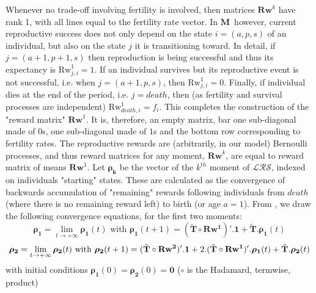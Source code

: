 \documentclass[10pt,a4paper]{article}
\newcommand{\M}{$\mathbf{M}$}
\newcommand{\LRO}{$\mathcal{LRS}$}
\newcommand{\PCoR}{\emph{individual} costs}
\newcommand{\vLRO}{$\sigma_{\mathrm{\mathcal{LRS}}}^2$}
\begin{document}
Whenever no trade-off involving fertility is involved, then matrices $\mathbf{Rw}^{k}$ have rank 1, with all lines equal to the fertility rate vector.%
In \M\ however,%
current reproductive success does not only depend on the state $i=(a,p,s)$ of an individual, but also on the state $j$ it is transitioning toward. In detail, if $j=(a+1,p+1,s)$ then reproduction is being successful and thus its expectancy is $\mathrm{Rw}^{1}_{j,i}=1$. If an individual survives but its reproductive event is not successful, i.e. when $j=(a+1,p,s)$, then $\mathrm{Rw}^{1}_{j,i}=0$. Finally, if individual dies at the end of the period, i.e. $j=death$, then (as fertility and survival processes are independent) $\mathrm{Rw}^{1}_{death,i}=f_{i}$. This completes the construction of the "reward matrix" $\mathbf{Rw}^{1}$. It is, therefore, an empty matrix, bar one sub-diagonal made of $0$s, one sub-diagonal made of $1$s and the bottom row corresponding to fertility rates.
The reproductive rewards are (arbitrarily, in our model) Bernoulli processes, and thus reward matrices for any moment, $\mathbf{Rw}^{k}$, are equal to reward matrix of means $\mathbf{Rw}^{1}$.
Let $\mathbf{\boldsymbol{\rho}}_\mathbf{k}$ be the vector of the $k^{th}$ moment of \LRO, indexed on individuals "starting" states. These are calculated as the convergence of backwards accumulation of "remaining" rewards following individuals from $death$ (where there is no remaining reward left) to birth (or age $a=1$). From \citep{Caswell2011a}, we draw the following convergence equations, for the first two moments: 
\begin{equation}
\mathbf{\boldsymbol{\rho}_1}=\lim\limits_{t \rightarrow +\infty} \mathbf{\boldsymbol{\rho}_{1}}(t) \text{     with } \mathbf{\boldsymbol{\rho}_{1}}(t+1)=(\tilde{\mathbf{T}}\circ \mathbf{Rw^{1}})'.\mathbf{1}+\tilde{\mathbf{T}}.\mathbf{\boldsymbol{\rho}_{1}}(t) 
\end{equation}
\begin{equation}
\mathbf{\boldsymbol{\rho}_2}=\lim\limits_{t \rightarrow +\infty} \mathbf{\boldsymbol{\rho}_{2}}(t) \text{     with }\\ \mathbf{\boldsymbol{\rho}_{2}}(t+1)=(\tilde{\mathbf{T}}\circ \mathbf{Rw^{2}})'.\mathbf{1}+2.(\tilde{\mathbf{T}}\circ \mathbf{Rw^{1}})'.\mathbf{\boldsymbol{\rho}_{1}}(t)+\tilde{\mathbf{T}}.\mathbf{\boldsymbol{\rho}_{2}}(t)
\end{equation} 
with initial conditions $\mathbf{\boldsymbol{\rho}_{1}}(0)=\mathbf{\boldsymbol{\rho}_{2}}(0)=\mathbf{0} $ ($\circ $ is the Hadamard, termwise, product)\\
 
\end{document}
